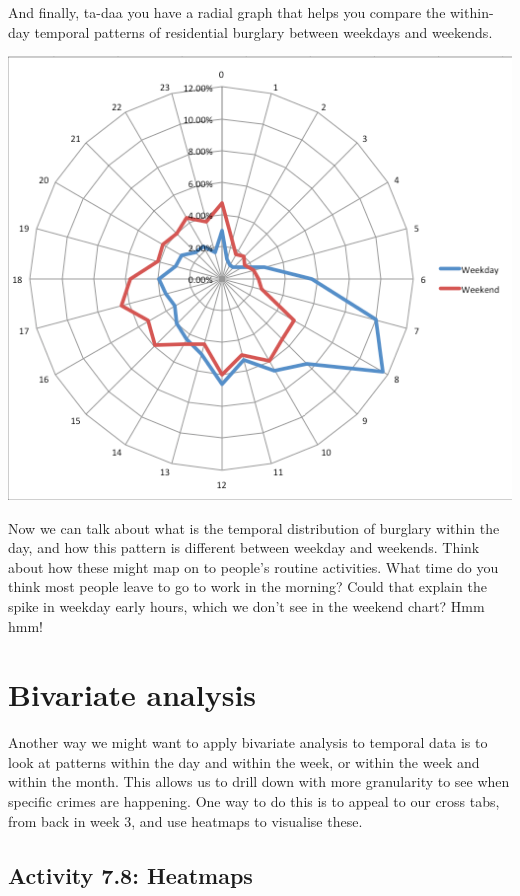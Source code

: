 \documentclass[
]{book}
\begin{document}
And finally, ta-daa you have a radial graph that helps you compare the within-day temporal patterns of residential burglary between weekdays and weekends.

\includegraphics{imgs/hr_r_28.png}

Now we can talk about what is the temporal distribution of burglary within the day, and how this pattern is different between weekday and weekends. Think about how these might map on to people's routine activities. What time do you think most people leave to go to work in the morning? Could that explain the spike in weekday early hours, which we don't see in the weekend chart? Hmm hmm!

\hypertarget{bivariate-analysis}{%
\section{Bivariate analysis}\label{bivariate-analysis}}

Another way we might want to apply bivariate analysis to temporal data is to look at patterns within the day and within the week, or within the week and within the month. This allows us to drill down with more granularity to see when specific crimes are happening. One way to do this is to appeal to our cross tabs, from back in week 3, and use heatmaps to visualise these.

\hypertarget{activity-7.8-heatmaps}{%
\subsection{Activity 7.8: Heatmaps}\label{activity-7.8-heatmaps}}
\end{document}
